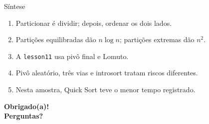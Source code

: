 \documentclass[aspectratio=169,11pt]{beamer}
\begin{document}
\begin{frame}{Síntese}
  \begin{enumerate}
    \item Particionar é dividir; depois, ordenar os dois lados.
    \item Partições equilibradas dão \(n\log n\); partições extremas dão \(n^2\).
    \item A \texttt{lesson11} usa pivô final e Lomuto.
    \item Pivô aleatório, três vias e introsort tratam riscos diferentes.
    \item Nesta amostra, Quick Sort teve o menor tempo registrado.
  \end{enumerate}
  \vspace{.5em}
  \begin{center}
    \Large\bfseries Obrigado(a)!\\[-.1em]
    \normalsize Perguntas?
  \end{center}
\end{frame}
\end{document}
